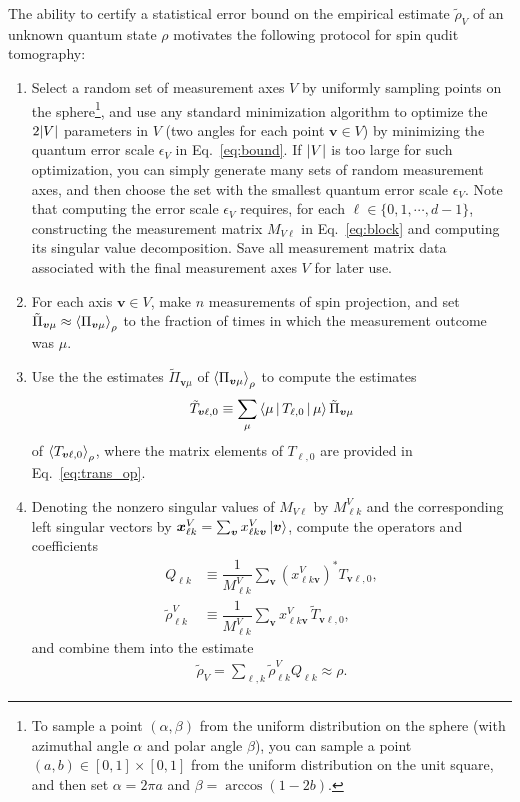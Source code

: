 \documentclass[nofootinbib,twocolumn]{revtex4-1}
\newcommand{\f}[2]{\dfrac{#1}{#2}} %
\newcommand{\p}[1]{\left(#1\right)} %
\newcommand{\bk}{\Braket} %
\renewcommand{\set}[1]{\{#1\}} %
\begin{document}
The ability to certify a statistical error bound on the empirical estimate $\tilde\rho_V$ of an unknown quantum state $\rho$ motivates the following protocol for spin qudit tomography:
\begin{enumerate}
\item Select a random set of measurement axes $V$ by uniformly sampling points on the sphere\footnote{To sample a point $\p{\alpha,\beta}$ from the uniform distribution on the sphere (with azimuthal angle $\alpha$ and polar angle $\beta$), you can sample a point $\p{a,b}\in[0,1]\times[0,1]$ from the uniform distribution on the unit square, and then set $\alpha=2\pi a$ and $\beta=\arccos\p{1-2b}$.}, and use any standard minimization algorithm to optimize the $2\abs{V}$ parameters in $V$ (two angles for each point $\bm v\in V$) by minimizing the quantum error scale $\epsilon_V$ in Eq.~\eqref{eq:bound}.
If $\abs{V}$ is too large for such optimization, you can simply generate many sets of random measurement axes, and then choose the set with the smallest quantum error scale $\epsilon_V$.
Note that computing the error scale $\epsilon_V$ requires, for each $\ell\in\set{0,1,\cdots,d-1}$, constructing the measurement matrix $M_{V\ell}$ in Eq.~\eqref{eq:block} and computing its singular value decomposition.
Save all measurement matrix data associated with the final measurement axes $V$ for later use.
\item For each axis $\bm v\in V$, make $n$ measurements of spin projection, and set $\tilde\Pi_{\bm v\mu}\approx\bk{\Pi_{\bm v\mu}}_\rho$ to the fraction of times in which the measurement outcome was $\mu$.
\item Use the the estimates $\tilde\Pi_{\bm v\mu}$ of $\bk{\Pi_{\bm v\mu}}_\rho$ to compute the estimates
\begin{align}
  \tilde T_{\bm v\ell,0}
  \equiv \sum_\mu \bk{\mu|T_{\ell,0}|\mu} \tilde\Pi_{\bm v\mu}
\end{align}
of $\bk{T_{\bm v\ell,0}}_\rho$, where the matrix elements of $T_{\ell,0}$ are provided in Eq.~\eqref{eq:trans_op}.
\item Denoting the nonzero singular values of $M_{V\ell}$ by $M^V_{\ell k}$ and the corresponding left singular vectors by $\bm x^V_{\ell k} = \sum_{\bm v} x^V_{\ell k \bm v} \ket{\bm v}$, compute the  operators and coefficients
\begin{align}
  Q_{\ell k} &\equiv \f1{M^V_{\ell k}} \sum_{\bm v}
  \p{x^V_{\ell k\bm v}}^* T_{\bm v\ell,0}, \\
  \tilde\rho^V_{\ell k} &\equiv \f1{M^V_{\ell k}} \sum_{\bm v}
  x^V_{\ell k\bm v} \, \tilde T_{\bm v\ell,0},
\end{align}
and combine them into the estimate
\begin{align}
  \tilde\rho_V = \sum_{\ell,k} \tilde\rho^V_{\ell k} Q_{\ell k}
  \approx \rho.
\end{align}
\end{enumerate}
\end{document}
